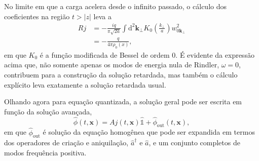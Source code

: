 \documentclass[10pt]{article}
\begin{document}
\begin{multicols*}{2}
    No limite em que a carga acelera desde o infinito passado, o cálculo dos coeficientes na região \(t>\lvert z\rvert\) leva a
    \begin{equation}
        \begin{aligned}
            Rj&=-\frac{iq}{\pi\sqrt{2a}}\int\mathrm{d}^2\mathbf{k}_\perp K_0\left(\frac{k_\perp}{a}\right)w_{0\mathbf{k}_\perp}^2\\
            &=-\frac{q}{4\pi\rho_0(x)},
        \end{aligned}
    \end{equation}
    em que \(K_0\) é a função modificada de Bessel de ordem 0. É evidente da expressão acima que, não somente apenas os modos de energia nula de Rindler, \(\omega=0\), contribuem para a construção da solução retardada, mas também o cálculo explícito leva exatamente a solução retardada usual.

    Olhando agora para equação quantizada, a solução geral pode ser escrita em função da solução avançada,
    \begin{equation}
        \hat{\phi}(t,\mathbf{x})=Aj(t,\mathbf{x})\hat{\mathbb{1}}+\hat{\phi}_{\text{out}}(t,\mathbf{x}),
    \end{equation}
    em que \(\hat{\phi}_{\text{out}}\) é solução da equação homogênea que pode ser expandida em termos dos operadores de criação e aniquilação, \(\hat{a}^{\dagger}\) e \(\hat{a}\), e um conjunto completos de modos frequência positiva. 
    

\end{multicols*}
\end{document}
